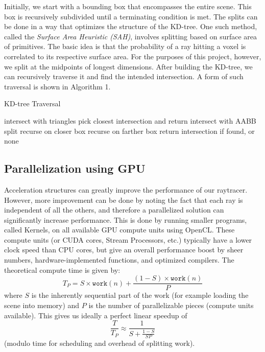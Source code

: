 \documentclass[letterpaper, 10 pt, conference]{ieeeconf}  %
\begin{document}
Initially, we start with a bounding box that encompasses the entire scene. This box is recursively subdivided until a terminating condition is met. The splits can be done in a way that optimizes the structure of the KD-tree. One such method, called the \textit{Surface Area Heuristic (SAH)}, involves splitting based on surface area of primitives. The basic idea is that the probability of a ray hitting a voxel is correlated to its respective surface area. For the purposes of this project, however, we split at the midpoints of longest dimensions. After building the KD-tree, we can recursively traverse it and find the intended intersection. A form of such traversal is shown in Algorithm 1.  

\begin{algorithm}[H]
\caption{KD-tree Traversal}
\begin{algorithmic}

    \STATE intersect with triangles
    \STATE pick closest intersection and return 
    \ENDIF
\ELSE
    \STATE intersect with AABB split 
        \STATE recurse on closer box
    \ENDIF
        \STATE recurse on farther box
    \ENDIF
    \STATE return intersection if found, or none
\ENDIF
\end{algorithmic}
\end{algorithm}

\subsection{Parallelization using GPU}

Acceleration structures can greatly improve the performance of our raytracer. However, more improvement can be done by noting the fact that each ray is independent of all the others, and therefore a parallelized solution can significantly increase performance. This is done by running smaller programs, called Kernels, on all available GPU compute units using OpenCL. These compute units (or CUDA cores, Stream Processors, etc.) typically have a lower clock speed than CPU cores, but give an overall performance boost by sheer numbers, hardware-implemented functions, and optimized compilers. The theoretical compute time is given by:
\[T_P=S\times\mathtt{work}(n)+\frac{(1-S)\times\mathtt{work}(n)}{P}\]
where $S$ is the inherently sequential part of the work (for example loading the scene into memory) and $P$ is the number of parallelizable pieces (compute units available). This gives us ideally a perfect linear speedup of
\[\frac{T}{T_P}\approx\frac{1}{S+\frac{1-S}{SP}}\]
(modulo time for scheduling and overhead of splitting work).
\end{document}
